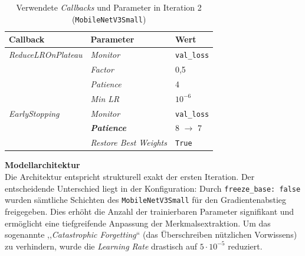 \documentclass[
    a4paper,        %
    11pt,           %
    ngerman,        %
    parskip=half,   %
    listof=totoc,   %
    bibliography=totoc %
]{scrartcl}
\begin{document}
\begin{table}[H]
    \centering
    \caption{Verwendete \textit{Callbacks} und Parameter in Iteration 2 (\texttt{MobileNetV3Small})}
    \label{tab:mnetv3s_callbacks_iter2}
    \begin{tabular}{lll}
        \toprule
        \textbf{Callback} & \textbf{Parameter} & \textbf{Wert} \\
        \midrule
        \textit{ReduceLROnPlateau} & \textit{Monitor} & \texttt{val\_loss} \\
                          & \textit{Factor} & 0,5 \\
                          & \textit{Patience} & 4 \\
                          & \textit{Min LR} & $10^{-6}$ \\
        \midrule
        \textit{EarlyStopping}     & \textit{Monitor} & \texttt{val\_loss} \\
                          & \textbf{\textit{Patience}} & 8 $\rightarrow$ 7 \\
                          & \textit{Restore Best Weights} & \texttt{True} \\
        \bottomrule
    \end{tabular}
\end{table}

\textbf{Modellarchitektur} \\
Die Architektur entspricht strukturell exakt der ersten Iteration. Der entscheidende Unterschied liegt in der Konfiguration: Durch \texttt{freeze\_base: false} wurden sämtliche Schichten des \texttt{MobileNetV3Small} für den Gradientenabstieg freigegeben. Dies erhöht die Anzahl der trainierbaren Parameter signifikant und ermöglicht eine tiefgreifende Anpassung der Merkmalsextraktion. Um das sogenannte ,,\textit{Catastrophic Forgetting}`` (das Überschreiben nützlichen Vorwissens) zu verhindern, wurde die \textit{Learning Rate} drastisch auf $5 \cdot 10^{-5}$ reduziert.
\end{document}
